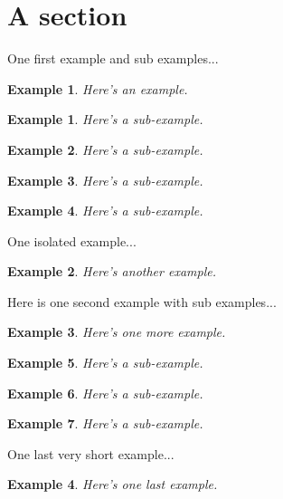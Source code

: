 \documentclass{article}
\newtheorem{example}{Example}[section]%
\newtheorem{subexample}{Example}[example]%
\begin{document}
\setcounter{section}{11}%
\section{A section}

\noindent One first example and sub examples...

\begin{example}
	Here's an example.
\end{example}

\begin{subexample}
	Here's a sub-example.
\end{subexample}

\begin{subexample}
	Here's a sub-example.
\end{subexample}

\begin{subexample}
	Here's a sub-example.
\end{subexample}

\begin{subexample}
	Here's a sub-example.
\end{subexample}


\noindent One isolated example...

\begin{example}
	Here's another example.
\end{example}


\noindent Here is one second example with sub examples...

\begin{example}
	Here's one more example.
\end{example}

\begin{subexample}
	Here's a sub-example.
\end{subexample}

\begin{subexample}
	Here's a sub-example.
\end{subexample}

\begin{subexample}
	Here's a sub-example.
\end{subexample}


\noindent One last very short example...

\begin{example}
	Here's one last example.
\end{example}
\end{document}
